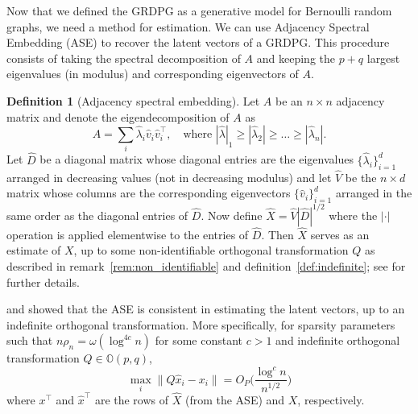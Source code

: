 \documentclass[
  12pt,
]{article}
\theoremstyle{definition}
\newtheorem{definition}{Definition}[section]
\theoremstyle{definition}
\theoremstyle{definition}
\theoremstyle{definition}
\theoremstyle{remark}
\begin{document}
Now that we defined the GRDPG as a generative model for Bernoulli random graphs,
we need a method for estimation.
We can use Adjacency Spectral Embedding (ASE) \citep{doi:10.1080/01621459.2012.699795} to recover the latent vectors of a GRDPG.
This procedure consists of taking the spectral decomposition of \(A\) and keeping the \(p + q\) largest eigenvalues (in modulus) and corresponding eigenvectors of \(A\).

\begin{definition}[Adjacency spectral embedding]
\label{def:ase}
Let $A$ be an $n
\times n$ adjacency matrix and denote the
eigendecomposition of $A$ as
$$A = \sum_{i} \hat{\lambda}_i \hat{v}_i \hat{v}_i^{\top}, \quad
\text{where} \,\,
|\hat{\lambda}|_1 \geq |\hat{\lambda}_2| \geq \dots \geq
|\hat{\lambda}_n|.$$
Let $\hat{D}$ be a diagonal matrix whose diagonal entries are
the eigenvalues $\{\hat{\lambda}_i\}_{i=1}^{d}$ arranged in decreasing values (not in
decreasing modulus) and let $\hat{V}$ be the $n \times d$ matrix whose
columns are the corresponding eigenvectors $\{\hat{v}_i\}_{i=1}^{d}$
arranged in the same order as the diagonal entries of $\hat{D}$. Now
define $\hat{X} = \hat{V} |\hat{D}|^{1/2}$ where the $|\cdot|$
operation is applied elementwise to the entries of $\hat{D}$. Then
$\hat{X}$ serves as an estimate of $X$, up to some non-identifiable
orthogonal transformation $Q$ as described in
remark~\ref{rem:non_identifiable} and definition~\ref{def:indefinite};
see \citet{rubindelanchy2017statistical} for further details.
\end{definition}

\citet{doi:10.1080/01621459.2012.699795} and \citet{rubindelanchy2017statistical} showed that the ASE is consistent in estimating the latent vectors, up to an indefinite orthogonal transformation.
More specifically, for sparsity parameters such that \(n \rho_n = \omega (\log^{4 c} n)\) for some constant \(c > 1\) and indefinite orthogonal transformation \(Q \in \mathbb{O}(p, q)\),
\[\max_i \|Q \hat{x}_i - x_i \| = O_P \bigg( \frac{\log^c n}{n^{1/2}} \bigg)\]
where \(x^\top\) and \(\hat{x}^\top\) are the rows of \(\hat{X}\) (from the ASE) and \(X\), respectively.
\end{document}
